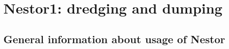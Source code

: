 \chapter{Nestor1: dredging and dumping}








\section{General information about usage of Nestor } \label{sec:E1GenInfo}
%
